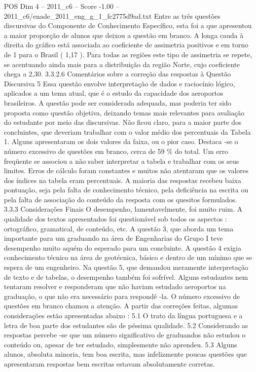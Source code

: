\begin{textsample}{POS Dim 4 – 2011\_c6 – Score -1.00 – 2011\_c6/enade\_2011\_eng\_g\_1\_fc2775d9ad.txt}
Entre as três questões discursivas do Componente de Conhecimento Específico, esta foi a que apresentou a maior proporção de alunos que deixou a questão em branco.
A longa cauda à direita do gráfico está associada ao coeficiente de assimetria positivos e em torno de 1 para o Brasil ( 1,17 ).
Para todas as regiões este tipo de assimetria se repete, se acentuando ainda mais para a distribuição da região Norte, cujo coeficiente chega a 2,30. 3.3.2.6 Comentários sobre a correção das respostas à Questão Discursiva 5 Essa questão envolve interpretação de dados e raciocínio lógico, aplicados a um tema atual, que é o estudo da capacidade dos aeroportos brasileiros.
A questão pode ser considerada adequada, mas poderia ter sido proposta como questão objetiva, deixando temas mais relevantes para avaliação do estudante por meio das discursivas.
Não ficou claro, para a maior parte dos concluintes, que deveriam trabalhar com o valor médio dos percentuais da Tabela 1.
Alguns apresentaram os dois valores da faixa, ou o pior caso.
Destaca -se o número excessivo de questões em branco, cerca de 59 \% do total.
Um erro freqüente se associou a não saber interpretar a tabela e trabalhar com os seus limites.
Erros de cálculo foram constantes e muitos não atentaram que os valores dos índices na tabela eram percentuais.
A maioria das respostas recebeu baixa pontuação, seja pela falta de conhecimento técnico, pela deficiência na escrita ou pela falta de associação do conteúdo da resposta com os quesitos formulados. 3.3.3 Considerações Finais O desempenho, lamentavelmente, foi muito ruim.
A qualidade dos textos apresentados foi questionável sob todos os aspectos : ortográfico, gramatical, de conteúdo, etc.
A questão 3, que aborda um tema importante para um graduando na área de Engenharias do Grupo I teve desempenho muito aquém do esperado para um concluinte.
A questão 4 exigia conhecimento técnico na área de geotécnica, básico e dentro de um mínimo que se espera de um engenheiro.
Na questão 5, que demandou meramente interpretação de texto e de tabelas, o desempenho também foi sofrível.
Alguns estudantes nem tentaram resolver e responderam que não haviam estudado aeroportos na graduação, o que não era necessário para respondê -la.
O número excessivo de questões em branco chamou a atenção.
A partir das correções feitas, algumas considerações estão apresentadas abaixo : 5.1 O trato da língua portuguesa e a letra de boa parte dos estudantes são de péssima qualidade. 5.2 Considerando as respostas percebe -se que um número significativo de graduandos não estudou o conteúdo ou, apesar de ter estudado, simplesmente não aprendeu. 5.3 Alguns alunos, absoluta minoria, tem boa escrita, mas infelizmente poucas questões que apresentaram respostas bem escritas estavam absolutamente corretas.

\end{textsample}
